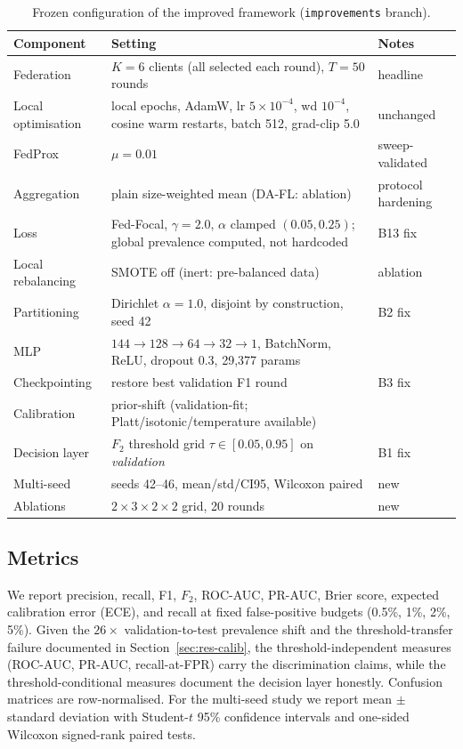 \begin{table}[t]
\centering
\caption{Frozen configuration of the improved framework
(\texttt{improvements} branch).}
\label{tab:hyper}
\small
\begin{tabularx}{\textwidth}{@{}l >{\raggedright\arraybackslash}X l@{}}
\toprule
\textbf{Component} & \textbf{Setting} & \textbf{Notes} \\
\midrule
Federation & $K=6$ clients (all selected each round), $T=50$ rounds &
headline \\
Local optimisation & 10 local epochs, AdamW, lr $5\times10^{-4}$, wd
$10^{-4}$, cosine warm restarts, batch 512, grad-clip 5.0 & unchanged \\
FedProx & $\mu = 0.01$ & sweep-validated \\
Aggregation & plain size-weighted mean (DA-FL: ablation) & protocol hardening \\
Loss & Fed-Focal, $\gamma=2.0$, $\alpha$ clamped $(0.05,0.25)$; global
prevalence computed, not hardcoded & B13 fix \\
Local rebalancing & SMOTE off (inert: pre-balanced data) & ablation \\
Partitioning & Dirichlet $\alpha=1.0$, disjoint by construction,
seed 42 & B2 fix \\
MLP & $144\!\to\!128\!\to\!64\!\to\!32\!\to\!1$, BatchNorm, ReLU,
dropout 0.3, 29{,}377 params & \\
Checkpointing & restore best validation F1 round & B3 fix \\
Calibration & prior-shift (validation-fit; Platt/isotonic/temperature
available) & \\
Decision layer & $F_2$ threshold grid $\tau\in[0.05,0.95]$ on
\emph{validation} & B1 fix \\
Multi-seed & seeds 42--46, mean/std/CI95, Wilcoxon paired & new \\
Ablations & $2\times3\times2\times2$ grid, 20 rounds & new \\
\bottomrule
\end{tabularx}
\end{table}

\subsection{Metrics}

We report precision, recall, F1, $F_2$, ROC-AUC, PR-AUC, Brier score,
expected calibration error (ECE), and recall at fixed false-positive
budgets (0.5\%, 1\%, 2\%, 5\%). Given the $26\times$
validation-to-test prevalence shift and the threshold-transfer failure
documented in Section~\ref{sec:res-calib}, the threshold-independent
measures (ROC-AUC, PR-AUC, recall-at-FPR) carry the discrimination
claims, while the threshold-conditional measures document the decision
layer honestly. Confusion matrices are row-normalised. For the
multi-seed study we report mean $\pm$ standard deviation with
Student-$t$ 95\% confidence intervals and one-sided Wilcoxon
signed-rank paired tests.

